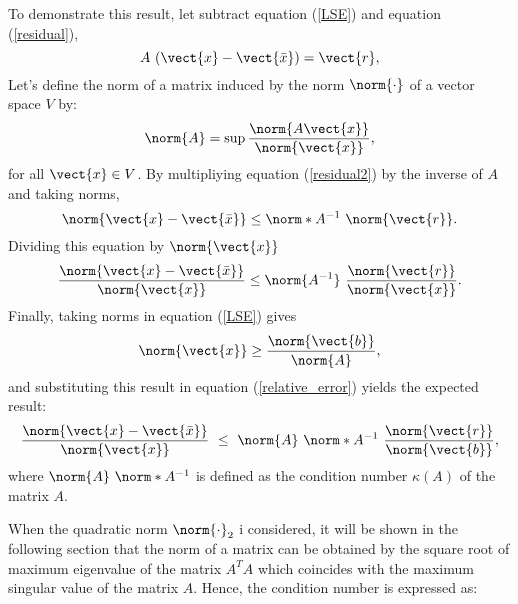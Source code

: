      To demonstrate this result, 
     let subtract equation (\ref{LSE}) and equation (\ref{residual}), 
       \begin{equation}
                A  \ ( \vect{x} - \vect{\bar x} )  = \vect{r},
                \label{residual2}
         \end{equation} 
    Let's define the norm of a matrix induced by the norm $ \norm{\cdot} $ of a 
    vector space $ V $ by: 
      \begin{equation}
           \norm{A} =  \sup \frac{ \norm{ A \vect{x} } }{\norm{\vect{x}}},  
        \end{equation} 
     for all $ \vect{x}  \in V $. 
     By multipliying equation (\ref{residual2}) by the inverse of $ A $ and 
     taking norms,   
     \begin{equation}
      \norm{ \vect{x} - \vect{\bar x}  } \le \norm*{ A^{-1} } \ \norm{\vect{r}}.
      \label{global_error}
     \end{equation} 
     Dividing this equation by $ \norm{ \vect{x} } $
     \begin{equation}
           \frac{ \norm{ \vect{x} - \vect{\bar x}  } }
                {    \norm{\vect{x}}    }
           \le \norm{ A^{-1} } \ 
           \frac{ \norm{\vect{r}} }{ \norm{ \vect{x} } }.
           \label{relative_error}
     \end{equation}
     Finally, taking norms in equation (\ref{LSE}) gives 
     \begin{equation}
           \norm{ \vect{x}  } \ge \frac{ \norm{ \vect{b} } }{ \norm{ A } },
           \label{SUB}
      \end{equation}
     and substituting this result in equation (\ref{relative_error})  yields 
     the expected result: 
     \begin{equation}
               \frac{\norm{ \vect{x} - \vect{\bar x}  }}{\norm{ \vect{x}}} \ 
               \leq \
                    \norm{ A } \ \norm*{ A^{-1} } \
                    \frac{\norm{ \vect{r}}}{\norm{\vect{b}}}, 
                    \label{error}
          \end{equation}
 where  $   \norm{ A } \ \norm*{ A^{-1} }  $ is defined as the condition number 
 $ 
 \kappa(A)$ of the matrix $ A$. 
     
    
     
When  the quadratic norm $\norm{\cdot}_2$ i considered, it will 
be shown in the following section that the norm of a matrix can be obtained by 
the square root of maximum eigenvalue of the matrix $ A^T A $ which coincides 
with the maximum singular value of the matrix $ A $. Hence, the condition 
number is expressed as:  


